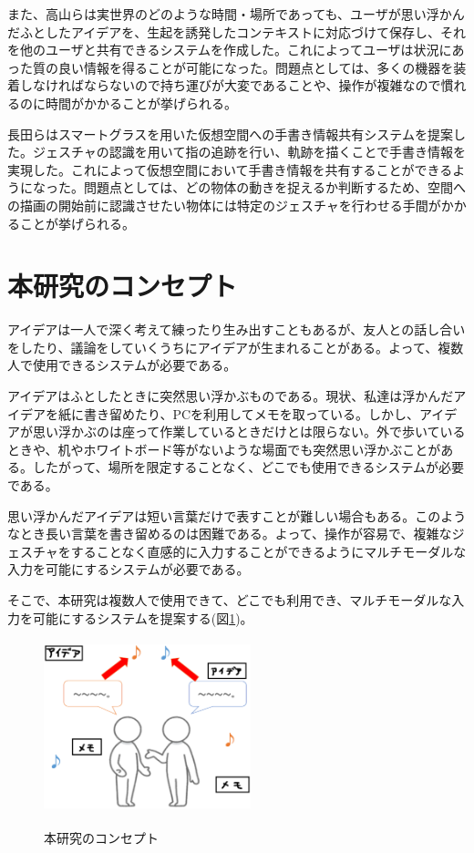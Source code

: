 \documentclass{hissymp}
\begin{document}
また、高山ら\cite{tex3,tex4}は実世界のどのような時間・場所であっても、ユーザが思い浮かんだふとしたアイデアを、生起を誘発したコンテキストに対応づけて保存し、それを他のユーザと共有できるシステムを作成した。これによってユーザは状況にあった質の良い情報を得ることが可能になった。問題点としては、多くの機器を装着しなければならないので持ち運びが大変であることや、操作が複雑なので慣れるのに時間がかかることが挙げられる。

長田ら\cite{tex5}はスマートグラスを用いた仮想空間への手書き情報共有システムを提案した。ジェスチャの認識を用いて指の追跡を行い、軌跡を描くことで手書き情報を実現した。これによって仮想空間において手書き情報を共有することができるようになった。問題点としては、どの物体の動きを捉えるか判断するため、空間への描画の開始前に認識させたい物体には特定のジェスチャを行わせる手間がかかることが挙げられる。

\section{本研究のコンセプト}
アイデアは一人で深く考えて練ったり生み出すこともあるが、友人との話し合いをしたり、議論をしていくうちにアイデアが生まれることがある。よって、複数人で使用できるシステムが必要である。

アイデアはふとしたときに突然思い浮かぶものである。現状、私達は浮かんだアイデアを紙に書き留めたり、PCを利用してメモを取っている。しかし、アイデアが思い浮かぶのは座って作業しているときだけとは限らない。外で歩いているときや、机やホワイトボード等がないような場面でも突然思い浮かぶことがある。したがって、場所を限定することなく、どこでも使用できるシステムが必要である。

思い浮かんだアイデアは短い言葉だけで表すことが難しい場合もある。このようなとき長い言葉を書き留めるのは困難である。よって、操作が容易で、複雑なジェスチャをすることなく直感的に入力することができるようにマルチモーダルな入力を可能にするシステムが必要である。

そこで、本研究は複数人で使用できて、どこでも利用でき、マルチモーダルな入力を可能にするシステムを提案する(図\ref{fig:concept})。

\begin{figure}[h]
  \begin{center}
    \includegraphics[clip,height=5.0cm,width=6.0cm]{./concept.eps}
    \caption{本研究のコンセプト}
    \label{fig:concept}
  \end{center}
\end{figure}
\end{document}
